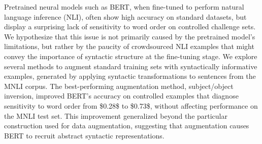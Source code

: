 Pretrained neural models such as BERT, when fine-tuned to perform natural language inference (NLI), often show high accuracy on standard datasets, but display a surprising lack of sensitivity to word order on controlled challenge sets. We hypothesize that this issue is not primarily caused by the pretrained model's limitations, but rather by the paucity of crowdsourced NLI examples that might convey the importance of syntactic structure at the fine-tuning stage. We explore several methods to augment standard training sets with syntactically informative examples, generated by applying syntactic transformations to sentences from the MNLI corpus. The best-performing augmentation method, subject/object inversion, improved BERT's accuracy on controlled examples that diagnose sensitivity to word order from \$0.28\$ to \$0.73\$, without affecting performance on the MNLI test set. This improvement generalized beyond the particular construction used for data augmentation, suggesting that augmentation causes BERT to recruit abstract syntactic representations.
